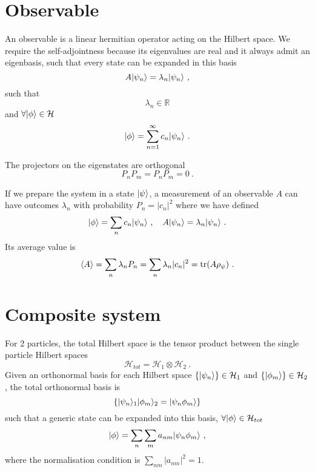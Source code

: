 \section{Observable}

    An observable is a linear hermitian operator acting on the Hilbert space. We require the self-adjointness because its eigenvalues are real and it always admit an eigenbasis, such that every state can be expanded in this basis 
    \begin{equation*}
        A \vert\psi_n\rangle = \lambda_n \vert\psi_n\rangle ~,
    \end{equation*}
    such that 
    \begin{equation*}
        \lambda_n \in \mathbb R
    \end{equation*}
    and $\forall \vert\phi\rangle \in \mathcal H$
    \begin{equation*}
        \vert\phi\rangle = \sum_{n=1}^{\infty} c_n \vert\psi_n\rangle ~.
    \end{equation*}

    The projectors on the eigenstates are orthogonal 
    \begin{equation*}
        P_n P_m = P_n P_m = 0 ~.
    \end{equation*}

    If we prepare the system in a state $\vert\psi\rangle$, a measurement of an observable $A$ can have outcomes $\lambda_n$ with probability $P_n = |c_n|^2$ where we have defined 
    \begin{equation*}
        \vert\phi\rangle = \sum_n c_n \vert\psi_n\rangle~, \quad A \vert\psi_n\rangle = \lambda_n \vert\psi_n\rangle ~.
    \end{equation*}
    Its average value is 
    \begin{equation*}
        \langle A\rangle = \sum_{n} \lambda_n P_n = \sum_{n} \lambda_n |c_n|^2 = \operatorname{tr}(A \rho_\psi) ~. 
    \end{equation*}

\section{Composite system}

    For $2$ particles, the total Hilbert space is the tensor product between the single particle Hilbert spaces 
    \begin{equation*}
        \mathcal H_{tot} = \mathcal H_1 \otimes \mathcal H_2 ~. 
    \end{equation*}
    Given an orthonormal basis for each Hilbert space $\{\vert\psi_n\rangle\} \in \mathcal H_1$ and $\{\vert\phi_m\rangle\} \in \mathcal H_2$, the total orthonormal basis is 
    \begin{equation*}
        \{\vert\psi_n\rangle_1 \vert\phi_m\rangle_2 = \vert\psi_n \phi_m\rangle\} 
    \end{equation*}
    such that a generic state can be expanded into this basis, $\forall \vert\phi\rangle \in \mathcal H_{tot}$
    \begin{equation*}
        \vert\phi\rangle = \sum_n \sum_m a_{nm} \vert\psi_n \phi_m\rangle ~,
    \end{equation*}
    where the normalisation condition is $\sum_{nm} |a_{nm}|^2 = 1$.

